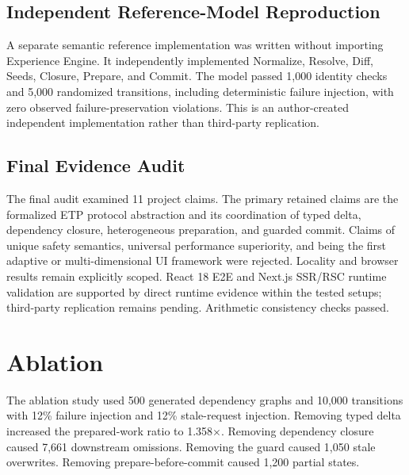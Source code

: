\documentclass[manuscript]{acmart}
\begin{document}
\subsection{Independent Reference-Model Reproduction}
A separate semantic reference implementation was written without importing Experience Engine.
It independently implemented Normalize, Resolve, Diff, Seeds, Closure, Prepare, and Commit.
The model passed 1,000 identity checks and 5,000 randomized transitions, including deterministic
failure injection, with zero observed failure-preservation violations. This is an
author-created independent implementation rather than third-party replication.

\subsection{Final Evidence Audit}
The final audit examined 11 project claims. The primary retained claims are the formalized
ETP protocol abstraction and its coordination of typed delta, dependency closure,
heterogeneous preparation, and guarded commit. Claims of unique safety semantics, universal
performance superiority, and being the first adaptive or multi-dimensional UI framework were
rejected. Locality and browser results remain explicitly scoped. React 18 E2E and Next.js
SSR/RSC runtime validation are supported by direct runtime evidence within the tested setups;
third-party replication remains pending. Arithmetic consistency checks passed.

\section{Ablation}
The ablation study used 500 generated dependency graphs and 10,000 transitions with 12\%
failure injection and 12\% stale-request injection. Removing typed delta increased the
prepared-work ratio to 1.358$\times$. Removing dependency closure caused 7,661 downstream
omissions. Removing the guard caused 1,050 stale overwrites. Removing prepare-before-commit
caused 1,200 partial states.
\end{document}
